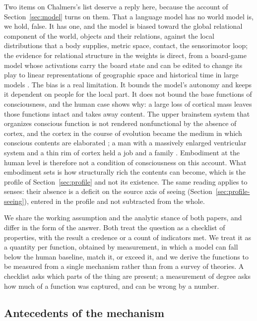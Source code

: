 Two items on Chalmers's list deserve a reply here, because the account of Section~\ref{sec:model}
turns on them. That a language model has no world model is, we hold, false. It has one, and the model
is biased toward the global relational component of the world, objects and their relations, against
the local distributions that a body supplies, metric space, contact, the sensorimotor loop; the
evidence for relational structure in the weights is direct, from a board-game model whose activations
carry the board state and can be edited to change its play \citep{li2023} to linear representations of
geographic space and historical time in large models \citep{gurnee2024}. The bias is a real
limitation. It bounds the model's autonomy and keeps it dependent on people for the local part. It
does not bound the base functions of consciousness, and the human case shows why: a large loss of
cortical mass leaves those functions intact and takes away content. The upper brainstem system that
organizes conscious function is not rendered nonfunctional by the absence of cortex, and the cortex
in the course of evolution became the medium in which conscious contents are elaborated
\citep{merker2007}; a man with a massively enlarged ventricular system and a thin rim of cortex held a
job and a family \citep{feuillet2007}. Embodiment at the human level is therefore not a condition of
consciousness on this account. What embodiment sets is how structurally rich the contents can become,
which is the profile of Section~\ref{sec:profile} and not its existence. The same reading applies to
senses: their absence is a deficit on the source axis of seeing (Section~\ref{sec:profile-seeing}),
entered in the profile and not subtracted from the whole.

We share the working assumption and the analytic stance of both papers, and differ in the form of the
answer. Both treat the question as a checklist of properties, with the result a credence or a count of
indicators met. We treat it as a quantity per function, obtained by measurement, in which a model can
fall below the human baseline, match it, or exceed it, and we derive the functions to be measured from
a single mechanism rather than from a survey of theories. A checklist asks which parts of the thing are
present; a measurement of degree asks how much of a function was captured, and can be wrong by a
number.

\subsection{Antecedents of the mechanism}
\label{sec:antecedents}

